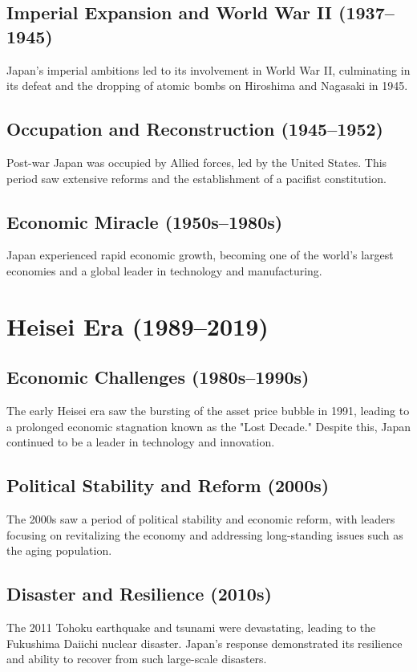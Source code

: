\documentclass{book}
\begin{document}
\subsection{Imperial Expansion and World War II (1937–1945)}
Japan’s imperial ambitions led to its involvement in World War II, culminating in its defeat and the dropping of atomic bombs on Hiroshima and Nagasaki in 1945.

\subsection{Occupation and Reconstruction (1945–1952)}
Post-war Japan was occupied by Allied forces, led by the United States. This period saw extensive reforms and the establishment of a pacifist constitution.

\subsection{Economic Miracle (1950s–1980s)}
Japan experienced rapid economic growth, becoming one of the world’s largest economies and a global leader in technology and manufacturing.

\section{Heisei Era (1989–2019)}
\label{sec:heisei-era}
\subsection{Economic Challenges (1980s–1990s)}
The early Heisei era saw the bursting of the asset price bubble in 1991, leading to a prolonged economic stagnation known as the "Lost Decade." Despite this, Japan continued to be a leader in technology and innovation.

\subsection{Political Stability and Reform (2000s)}
The 2000s saw a period of political stability and economic reform, with leaders focusing on revitalizing the economy and addressing long-standing issues such as the aging population.

\subsection{Disaster and Resilience (2010s)}
The 2011 Tohoku earthquake and tsunami were devastating, leading to the Fukushima Daiichi nuclear disaster. Japan’s response demonstrated its resilience and ability to recover from such large-scale disasters. 
\end{document}
